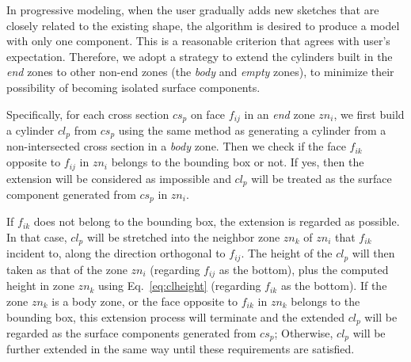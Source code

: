 In progressive modeling, when the user  gradually adds new sketches
that are closely related to the existing shape, the algorithm is
desired to produce a model with only one component. This is a
reasonable criterion that agrees with user's expectation. Therefore,
we adopt a strategy to extend the cylinders built in the
\textit{end} zones to other non-end zones (the \textit{body} and
\textit{empty} zones), to minimize their possibility of becoming
isolated surface components.

Specifically, for each cross  section $cs_p$ on face $f_{ij}$ in an
\textit{end} zone $zn_i$, we first build a cylinder $cl_p$ from
$cs_p$ using the same method as generating a cylinder from a
non-intersected cross section in a \textit{body} zone. Then we check
if the face $f_{ik}$ opposite to $f_{ij}$ in $zn_i$ belongs to the
bounding box or not. If yes, then the extension will be considered
as impossible and $cl_p$ will be treated as the surface component
generated from $cs_p$ in $zn_i$.

If $f_{ik}$ does not belong to the bounding box, the extension is
regarded as possible. In that case, $cl_p$ will be stretched into
the neighbor zone $zn_k$ of $zn_i$ that $f_{ik}$ incident to, along
the direction orthogonal to $f_{ij}$. The height of the $cl_p$ will
then taken as that of the zone $zn_i$ (regarding $f_{ij}$ as the
bottom), plus the computed height in zone $zn_k$ using
Eq.~\ref{eq:clheight} (regarding $f_{ik}$ as the bottom). If the
zone $zn_k$ is a body zone, or the face opposite to $f_{ik}$ in
$zn_k$ belongs to the bounding box, this extension process will
terminate and the extended $cl_p$ will be regarded as the surface
components generated from $cs_p$; Otherwise, $cl_p$ will be further
extended in the same way until these requirements are satisfied.

